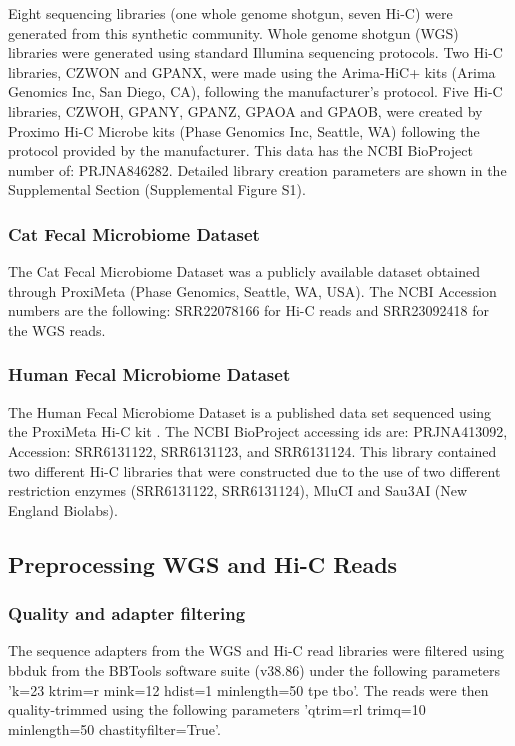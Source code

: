 \documentclass[fleqn,10pt,lineno]{wlpeerj}
\begin{document}
Eight sequencing libraries (one whole genome shotgun, seven Hi-C) were generated from this synthetic community. Whole genome shotgun  (WGS)  libraries were generated using standard Illumina sequencing protocols. Two Hi-C libraries, CZWON and GPANX, were made using the Arima-HiC+ kits (Arima Genomics Inc, San Diego, CA), following the manufacturer's protocol. Five Hi-C libraries, CZWOH, GPANY, GPANZ, GPAOA and GPAOB, were created by Proximo Hi-C Microbe kits (Phase Genomics Inc, Seattle, WA) following the protocol provided by the manufacturer. This data has the NCBI BioProject number of: PRJNA846282. Detailed library creation parameters are shown in the Supplemental Section (Supplemental Figure S1).

\subsubsection*{Cat Fecal Microbiome Dataset} 

The Cat Fecal Microbiome Dataset was a publicly available dataset obtained through ProxiMeta (Phase Genomics, Seattle, WA, USA). The NCBI Accession numbers are the following: SRR22078166 for Hi-C reads and SRR23092418 for the WGS reads.

\subsubsection*{Human Fecal Microbiome Dataset}

The Human Fecal Microbiome Dataset is a published data set sequenced using the ProxiMeta Hi-C kit \citep{press2017hi}. The NCBI BioProject accessing ids are: PRJNA413092, Accession: SRR6131122, SRR6131123, and SRR6131124. This library contained two different Hi-C libraries that were constructed due to the use of two different restriction enzymes (SRR6131122, SRR6131124), MluCI and Sau3AI (New England Biolabs).    

\subsection*{Preprocessing WGS and Hi-C Reads}

\subsubsection*{Quality and adapter filtering}

The sequence adapters from the WGS and Hi-C read libraries were filtered using bbduk from the BBTools software suite (v38.86) \citep{bushnell2014bbmap} under the following parameters 'k=23 ktrim=r mink=12 hdist=1 minlength=50 tpe tbo'. The reads were then quality-trimmed using the following parameters 'qtrim=rl trimq=10 minlength=50 chastityfilter=True'. 
\end{document}
